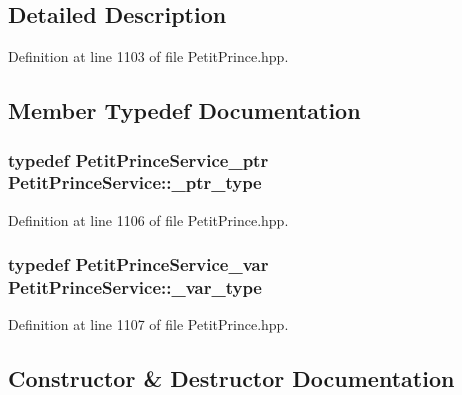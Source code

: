 \subsection{Detailed Description}


Definition at line 1103 of file Petit\+Prince.\+hpp.



\subsection{Member Typedef Documentation}
\subsubsection[{\texorpdfstring{\+\_\+ptr\+\_\+type}{_ptr_type}}]{\setlength{\rightskip}{0pt plus 5cm}typedef {\bf Petit\+Prince\+Service\+\_\+ptr} {\bf Petit\+Prince\+Service\+::\+\_\+ptr\+\_\+type}}\hypertarget{class_petit_prince_service_ad60338094e415ea827c80f317cdb4f99}{}\label{class_petit_prince_service_ad60338094e415ea827c80f317cdb4f99}


Definition at line 1106 of file Petit\+Prince.\+hpp.

\subsubsection[{\texorpdfstring{\+\_\+var\+\_\+type}{_var_type}}]{\setlength{\rightskip}{0pt plus 5cm}typedef {\bf Petit\+Prince\+Service\+\_\+var} {\bf Petit\+Prince\+Service\+::\+\_\+var\+\_\+type}}\hypertarget{class_petit_prince_service_a2c52498ad60e7e4405e4132c387cb019}{}\label{class_petit_prince_service_a2c52498ad60e7e4405e4132c387cb019}


Definition at line 1107 of file Petit\+Prince.\+hpp.



\subsection{Constructor \& Destructor Documentation}
